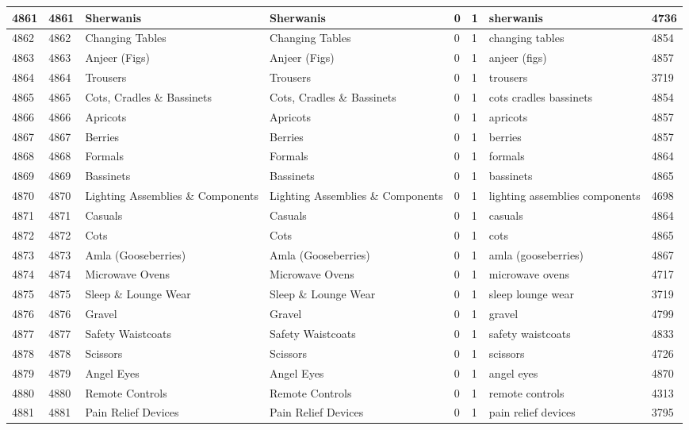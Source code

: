 \begin{longtable}{|l|l|l|l|l|l|l|l|}
4861 & 4861 & Sherwanis & Sherwanis & 0 & 1 & sherwanis & 4736 \\ \hline 
4862 & 4862 & Changing Tables & Changing Tables & 0 & 1 & changing tables & 4854 \\ \hline 
4863 & 4863 & Anjeer (Figs) & Anjeer (Figs) & 0 & 1 & anjeer (figs) & 4857 \\ \hline 
4864 & 4864 & Trousers & Trousers & 0 & 1 & trousers & 3719 \\ \hline 
4865 & 4865 & Cots, Cradles \& Bassinets & Cots, Cradles \& Bassinets & 0 & 1 & cots cradles bassinets & 4854 \\ \hline 
4866 & 4866 & Apricots & Apricots & 0 & 1 & apricots & 4857 \\ \hline 
4867 & 4867 & Berries & Berries & 0 & 1 & berries & 4857 \\ \hline 
4868 & 4868 & Formals & Formals & 0 & 1 & formals & 4864 \\ \hline 
4869 & 4869 & Bassinets & Bassinets & 0 & 1 & bassinets & 4865 \\ \hline 
4870 & 4870 & Lighting Assemblies \& Components & Lighting Assemblies \& Components & 0 & 1 & lighting assemblies components & 4698 \\ \hline 
4871 & 4871 & Casuals & Casuals & 0 & 1 & casuals & 4864 \\ \hline 
4872 & 4872 & Cots & Cots & 0 & 1 & cots & 4865 \\ \hline 
4873 & 4873 & Amla (Gooseberries) & Amla (Gooseberries) & 0 & 1 & amla (gooseberries) & 4867 \\ \hline 
4874 & 4874 & Microwave Ovens & Microwave Ovens & 0 & 1 & microwave ovens & 4717 \\ \hline 
4875 & 4875 & Sleep \& Lounge Wear & Sleep \& Lounge Wear & 0 & 1 & sleep lounge wear & 3719 \\ \hline 
4876 & 4876 & Gravel & Gravel & 0 & 1 & gravel & 4799 \\ \hline 
4877 & 4877 & Safety Waistcoats & Safety Waistcoats & 0 & 1 & safety waistcoats & 4833 \\ \hline 
4878 & 4878 & Scissors & Scissors & 0 & 1 & scissors & 4726 \\ \hline 
4879 & 4879 & Angel Eyes & Angel Eyes & 0 & 1 & angel eyes & 4870 \\ \hline 
4880 & 4880 & Remote Controls & Remote Controls & 0 & 1 & remote controls & 4313 \\ \hline 
4881 & 4881 & Pain Relief Devices & Pain Relief Devices & 0 & 1 & pain relief devices & 3795 \\ \hline 

\end{longtable}
